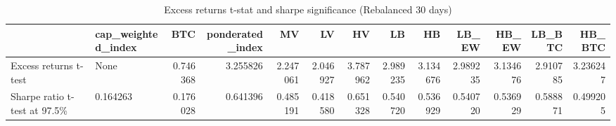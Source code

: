 \begin{table}
\centering
\caption{Excess returns t-stat and sharpe significance (Rebalanced 30 days)}
\label{signif20_30}
\begin{tabular}{llrrrrrrrrrrr}
\toprule
{} & cap\_weighted\_index &       BTC &  ponderated\_index &        MV &        LV &        HV &        LB &        HB &     LB\_EW &     HB\_EW &    LB\_BTC &    HB\_BTC \\
\midrule
Excess returns t-test        &               None &  0.746368 &          3.255826 &  2.247061 &  2.046927 &  3.787962 &  2.989235 &  3.134676 &  2.989235 &  3.134676 &  2.910785 &  3.236247 \\
Sharpe ratio t-test at 97.5\% &           0.164263 &  0.176028 &          0.641396 &  0.485191 &  0.418580 &  0.651328 &  0.540720 &  0.536929 &  0.540720 &  0.536929 &  0.588871 &  0.499205 \\
\bottomrule
\end{tabular}
\end{table}
